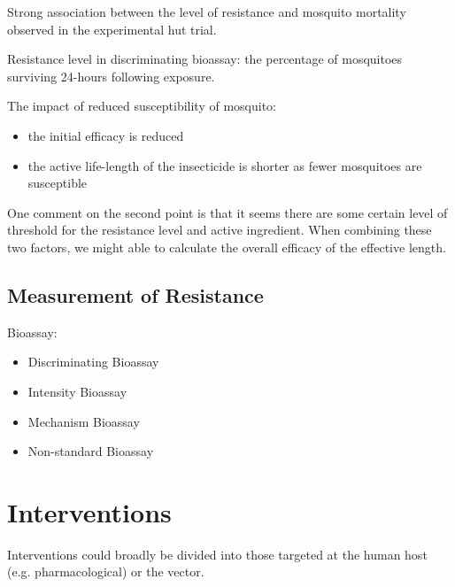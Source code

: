 \documentclass[a4paper, 12pt, twoside]{article}
\begin{document}
Strong association between the level of resistance and mosquito mortality observed in the experimental hut trial\cite{Sherrard-Smith2018b}.

Resistance level in discriminating bioassay: the percentage of mosquitoes surviving 24-hours following exposure.

The impact of reduced susceptibility of mosquito:
\begin{itemize}
	\item the initial efficacy is reduced
	\item the active life-length of the insecticide is shorter as fewer mosquitoes are susceptible
\end{itemize}


One comment on the second point is that it seems there are some certain level of threshold for the resistance level and active ingredient. When combining these two factors, we might able to calculate the overall efficacy of the effective length.

\subsection{Measurement of Resistance}

Bioassay:

\begin{itemize}
	\item Discriminating Bioassay
	\item Intensity Bioassay
	\item Mechanism Bioassay
	\item Non-standard Bioassay
\end{itemize}

\section{Interventions}

Interventions could broadly be divided into those targeted at the human host (e.g. pharmacological) or the vector.
\end{document}
